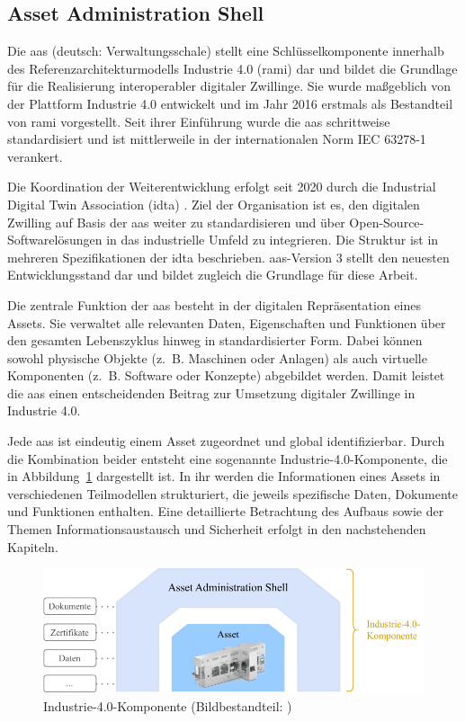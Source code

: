 \newpage
\subsection{Asset Administration Shell}
\label{chap:AAS}

Die \acs{aas} (deutsch: Verwaltungsschale) stellt eine Schlüsselkomponente innerhalb des Referenzarchitekturmodells Industrie 4.0 (\acs{rami}) \cite{RAMI4.0} dar und bildet die Grundlage für die Realisierung interoperabler digitaler Zwillinge. 
Sie wurde maßgeblich von der Plattform Industrie 4.0 entwickelt und im Jahr 2016 erstmals als Bestandteil von \acs{rami} vorgestellt. 
Seit ihrer Einführung wurde die \acs{aas} schrittweise standardisiert und ist mittlerweile in der internationalen Norm IEC 63278-1 \cite{AASIEC63278} verankert.

Die Koordination der Weiterentwicklung erfolgt seit 2020 durch die Industrial Digital Twin Association (\acs{idta}) \cite{IDTA}. 
Ziel der Organisation ist es, den digitalen Zwilling auf Basis der \acs{aas} weiter zu standardisieren und über Open-Source-Softwarelösungen in das industrielle Umfeld zu integrieren. 
Die Struktur ist in mehreren Spezifikationen der \acs{idta} beschrieben.
\acs{aas}-Version 3 stellt den neuesten Entwicklungsstand dar und bildet zugleich die Grundlage für diese Arbeit.

Die zentrale Funktion der \acs{aas} besteht in der digitalen Repräsentation eines Assets. 
Sie verwaltet alle relevanten Daten, Eigenschaften und Funktionen über den gesamten Lebenszyklus hinweg in standardisierter Form. 
Dabei können sowohl physische Objekte (z.~B. Maschinen oder Anlagen) als auch virtuelle Komponenten (z.~B. Software oder Konzepte) abgebildet werden. 
Damit leistet die \acs{aas} einen entscheidenden Beitrag zur Umsetzung digitaler Zwillinge in Industrie 4.0.

Jede \acs{aas} ist eindeutig einem Asset zugeordnet und global identifizierbar. 
Durch die Kombination beider entsteht eine sogenannte Industrie-4.0-Komponente, die in Abbildung~\ref{fig:Industrie4Komponente} dargestellt ist. 
In ihr werden die Informationen eines Assets in verschiedenen Teilmodellen strukturiert, die jeweils spezifische Daten, Dokumente und Funktionen enthalten.
Eine detaillierte Betrachtung des Aufbaus sowie der Themen Informationsaustausch und Sicherheit erfolgt in den nachstehenden Kapiteln.

\begin{figure}[htbp]
    \centering
    \includegraphics[width=1\textwidth]{Bilder/I4Komponente/I4KomponenteNeu.pdf}
    \caption[Industrie-4.0-Komponente]{Industrie-4.0-Komponente (Bildbestandteil: \cite{robocellLogo})}
    \label{fig:Industrie4Komponente}
\end{figure}

